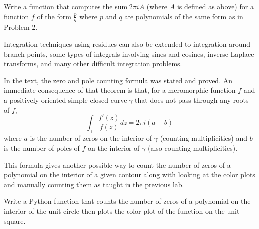 \begin{problem}
Write a function that computes the sum $2\pi i A$ (where $A$ is defined as above) for a function $f$ of the form $\frac{p}{q}$ where $p$ and $q$ are polynomials of the same form as in Problem 2.
\end{problem}

Integration techniques using residues can also be extended to integration around branch points, some types of integrals involving sines and cosines, inverse Laplace transforms, and many other difficult integration problems.

\begin{problem}
In the text, the zero and pole counting formula was stated and proved.
An immediate consequence of that theorem is that, for a meromorphic function $f$ and a positively oriented simple closed curve $\gamma$ that does not pass through any roots of $f$,
\[\int_\gamma \frac{f'\left(z\right)}{f\left(z\right)} dz = 2 \pi i \left(a - b\right)\]
where $a$ is the number of zeros on the interior of $\gamma$ (counting multiplicities) and $b$ is the number of poles of $f$ on the interior of $\gamma$ (also counting multiplicities).

This formula gives another possible way to count the number of zeros of a polynomial on the interior of a given contour along with looking at the color plots and manually counting them as taught in the previous lab.

Write a Python function that counts the number of zeros of a polynomial on the interior of the unit circle then plots the color plot of the function on the unit square.
\end{problem}
